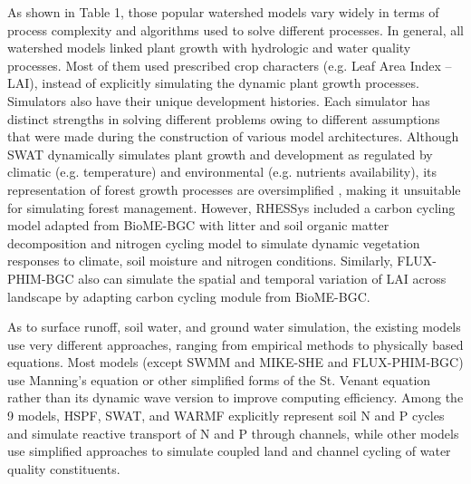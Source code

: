 \documentclass[preprint,review, 12pt]{elsarticle}
\begin{document}
As shown in Table 1, those popular watershed models vary widely in terms of process complexity and algorithms used to solve different processes. In general, all watershed models linked plant growth with hydrologic and water quality processes. Most of them used prescribed crop characters (e.g. Leaf Area Index -- LAI), instead of explicitly simulating the dynamic plant growth processes. Simulators also have their unique development histories. Each simulator has distinct strengths in solving different problems owing to different assumptions that were made during the construction of various model architectures. Although SWAT dynamically simulates plant growth and development as regulated by climatic (e.g. temperature) and environmental (e.g. nutrients availability), its representation of forest growth processes are oversimplified \citep{Yang2016}, making it unsuitable for simulating forest management. However, RHESSys \citep{Tague2004d} included a carbon cycling model adapted from BioME-BGC \citep{thornton1998regional} with litter and soil organic matter decomposition and nitrogen cycling model \citep{parton1996generalized} to simulate dynamic vegetation responses to climate, soil moisture and nitrogen conditions. Similarly, FLUX-PHIM-BGC \citep{Shi2018} also can simulate the spatial and temporal variation of LAI across landscape by adapting carbon cycling module from BioME-BGC.

As to surface runoff, soil water, and ground water simulation, the existing models use very different approaches, ranging from empirical methods to physically based equations. Most models (except SWMM and MIKE-SHE and FLUX-PHIM-BGC) use Manning’s equation or other simplified forms of the St. Venant equation rather than its dynamic wave version to improve computing efficiency. Among the 9 models, HSPF, SWAT, and WARMF explicitly represent soil N and P cycles and simulate reactive transport of N and P through channels, while other models use simplified approaches to simulate coupled land and channel cycling of water quality constituents. 
\end{document}
